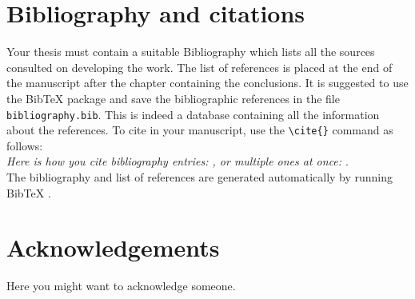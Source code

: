 \documentclass[11pt,a4paper]{article}
\begin{document}












\section{Bibliography and citations}
Your thesis must contain a suitable Bibliography which lists all the sources consulted on developing the work.
The list of references is placed at the end of the manuscript after the chapter containing the conclusions.
It is suggested to use the BibTeX package and save the bibliographic references in the file \verb|bibliography.bib|.
This is indeed a database containing all the information about the references. To cite in your manuscript, use the \verb|\cite{}| command as follows:
\\
\textit{Here is how you cite bibliography entries: \cite{rossetti2024ysocialllmpoweredsocial}, or multiple ones at once: \cite{rossetti2024ysocialllmpoweredsocial,rossetti2024ysocialllmpoweredsocial}}.
\\
The bibliography and list of references are generated automatically by running BibTeX \cite{rossetti2024ysocialllmpoweredsocial}.





\cleardoublepage



\section*{Acknowledgements}
Here you might want to acknowledge someone.

\end{document}
